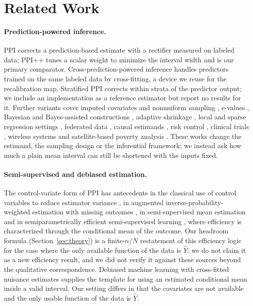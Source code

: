 \documentclass{article}
\newcommand{\Yhat}{\hat Y}
\begin{document}
\section{Related Work}
\paragraph{Prediction-powered inference.} PPI \citep{Angelopoulos2023PredictionpoweredI} corrects a prediction-based estimate with a rectifier measured on labeled data; PPI++ \citep{Angelopoulos2023PPIEP} tunes a scalar weight to minimize the interval width and is our primary comparator. Cross-prediction-powered inference \citep{Zrnic2023CrosspredictionpoweredI} handles predictors trained on the same labeled data by cross-fitting, a device we reuse for the recalibration map. Stratified PPI \citep{Fisch2024StratifiedPI} corrects within strata of the predictor output; we include an implementation as a reference estimator but report no results for it. Further variants cover imputed covariates and nonuniform sampling \citep{Kluger2025PredictionPoweredIW}, e-values \citep{Csillag2025PredictionPoweredE}, Bayesian and Bayes-assisted constructions \citep{Hofer2024BayesianPI,Kilian2025AnytimevalidBI,Cortinovis2025FABPPIFA}, adaptive shrinkage \citep{Li2025PredictionPoweredAS}, local and sparse regression settings \citep{Gu2024LocalPI,Song2025SparseEA}, federated data \citep{Luo2024FederatedPI}, causal estimands \citep{Cadei2025PredictionPoweredCI}, risk control \citep{Einbinder2024SemiSupervisedRC}, clinical trials \citep{Poulet2025PredictionpoweredIF}, wireless systems \citep{Sifaou2024SemiSupervisedLV} and satellite-based poverty analysis \citep{Pettersson2025DebiasingML}. These works change the estimand, the sampling design or the inferential framework; we instead ask how much a plain mean interval can still be shortened with the inputs fixed.

\paragraph{Semi-supervised and debiased estimation.} The control-variate form of PPI has antecedents in the classical use of control variables to reduce estimator variance \citep{Lavenberg1981Perspective}, in augmented inverse-probability-weighted estimation with missing outcomes \citep{Robins1994Estimation,Bang2005Doubly}, in semi-supervised mean estimation \citep{Zhang2016SemisupervisedIG} and in semiparametrically efficient semi-supervised learning \citep{Xu2025AUF}, where efficiency is characterized through the conditional mean of the outcome. Our headroom formula (Section~\ref{sec:theory}) is a finite-$n/N$ restatement of this efficiency logic for the case where the only available function of the data is $\Yhat$; we do not claim it as a new efficiency result, and we did not verify it against these sources beyond the qualitative correspondence. Debiased machine learning with cross-fitted nuisance estimates \citep{Chernozhukov2017DoubledebiasedML} supplies the template for using an estimated conditional mean inside a valid interval. Our setting differs in that the covariates are not available and the only usable function of the data is $\Yhat$.
\end{document}

